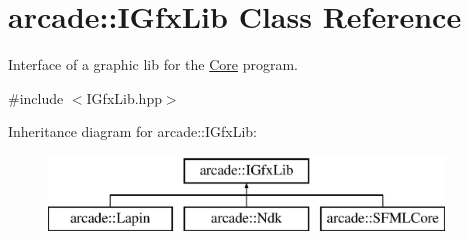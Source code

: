 \hypertarget{classarcade_1_1_i_gfx_lib}{\section{arcade\-:\-:I\-Gfx\-Lib Class Reference}
\label{classarcade_1_1_i_gfx_lib}
}


Interface of a graphic lib for the \hyperlink{classarcade_1_1_core}{Core} program.  




{\ttfamily \#include $<$I\-Gfx\-Lib.\-hpp$>$}

Inheritance diagram for arcade\-:\-:I\-Gfx\-Lib\-:\begin{figure}[H]
\begin{center}
\leavevmode
\includegraphics[height=2.000000cm]{classarcade_1_1_i_gfx_lib}
\end{center}
\end{figure}
